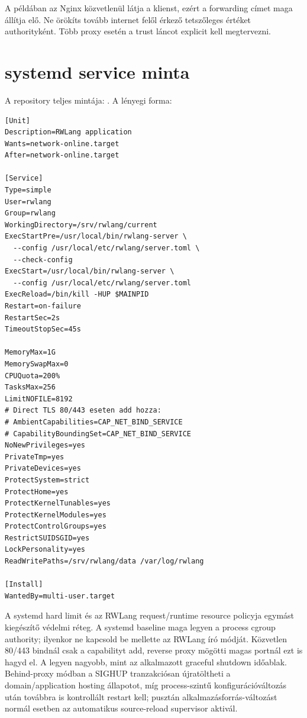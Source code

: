 A példában az Nginx közvetlenül látja a klienst, ezért a forwarding címet maga állítja elő. Ne örökíts tovább internet felől érkező tetszőleges  értéket authorityként. Több proxy esetén a trust láncot explicit kell megtervezni.

\section{systemd service minta}

A repository teljes mintája: . A lényegi forma:

\begin{lstlisting}
[Unit]
Description=RWLang application
Wants=network-online.target
After=network-online.target

[Service]
Type=simple
User=rwlang
Group=rwlang
WorkingDirectory=/srv/rwlang/current
ExecStartPre=/usr/local/bin/rwlang-server \
  --config /usr/local/etc/rwlang/server.toml \
  --check-config
ExecStart=/usr/local/bin/rwlang-server \
  --config /usr/local/etc/rwlang/server.toml
ExecReload=/bin/kill -HUP $MAINPID
Restart=on-failure
RestartSec=2s
TimeoutStopSec=45s

MemoryMax=1G
MemorySwapMax=0
CPUQuota=200%
TasksMax=256
LimitNOFILE=8192
# Direct TLS 80/443 eseten add hozza:
# AmbientCapabilities=CAP_NET_BIND_SERVICE
# CapabilityBoundingSet=CAP_NET_BIND_SERVICE
NoNewPrivileges=yes
PrivateTmp=yes
PrivateDevices=yes
ProtectSystem=strict
ProtectHome=yes
ProtectKernelTunables=yes
ProtectKernelModules=yes
ProtectControlGroups=yes
RestrictSUIDSGID=yes
LockPersonality=yes
ReadWritePaths=/srv/rwlang/data /var/log/rwlang

[Install]
WantedBy=multi-user.target
\end{lstlisting}

A systemd hard limit és az RWLang request/runtime resource policyja egymást kiegészítő védelmi réteg. A systemd baseline maga legyen a process cgroup authority; ilyenkor ne kapcsold be mellette az RWLang \code{[cgroup]} író módját. Közvetlen 80/443 bindnál csak a  capabilityt add, reverse proxy mögötti magas portnál ezt is hagyd el. A  legyen nagyobb, mint az alkalmazott graceful shutdown időablak. Behind-proxy módban a SIGHUP tranzakciósan újratöltheti a domain/application hosting állapotot, míg process-szintű konfigurációváltozás után továbbra is kontrollált restart kell; pusztán alkalmazásforrás-változást normál esetben az automatikus source-reload supervisor aktivál.

